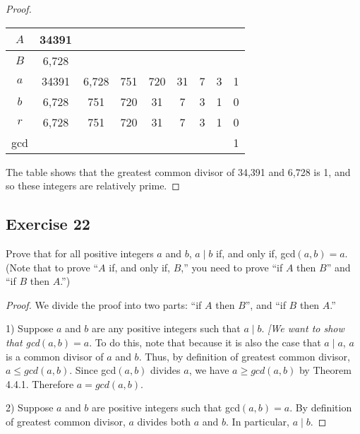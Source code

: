 \documentclass[14pt]{extarticle}
\begin{document}
\begin{proof}
    \begin{center}
        \begin{tabular}{|c|c|c|c|c|c|c|c|c|}
            \hline
            $A$ & 34391 &       &     &     &    &   &   &   \\
            \hline
            $B$ & 6,728 &       &     &     &    &   &   &   \\
            \hline
            $a$ & 34391 & 6,728 & 751 & 720 & 31 & 7 & 3 & 1 \\
            \hline
            $b$ & 6,728 & 751   & 720 & 31  & 7  & 3 & 1 & 0 \\
            \hline
            $r$ & 6,728 & 751   & 720 & 31  & 7  & 3 & 1 & 0 \\
            \hline
            gcd &       &       &     &     &    &   &   & 1 \\
            \hline
        \end{tabular}
    \end{center}

    The table shows that the greatest common divisor of 34,391 and 6,728 is 1, and so these integers are relatively prime.
\end{proof}

\subsection{Exercise 22}
Prove that for all positive integers $a$ and $b$, $a \mid b$ if, and only if, gcd$(a, b) = a$. (Note that to prove “$A$ if, and only if, $B$,” you need to prove “if $A$ then $B$” and “if $B$ then $A$.”)

\begin{proof}
    We divide the proof into two parts: “if $A$ then $B$”, and “if $B$ then $A$.”

    1) Suppose $a$ and $b$ are any positive integers such that $a\mid b$. {\it [We want to show that gcd$(a, b) = a$}. To do this, note that because it is also the case that $a \mid a$, $a$ is a common divisor of $a$ and $b$. Thus, by definition of greatest common divisor, $a \leq gcd(a, b)$. Since gcd$(a,b)$ divides $a$, we have $a \geq gcd(a, b)$ by Theorem 4.4.1. Therefore $a = gcd(a,b)$.

    2) Suppose $a$ and $b$ are positive integers such that gcd$(a, b) = a$. By definition of greatest common divisor, $a$ divides both $a$ and $b$. In particular, $a \mid b$.
\end{proof}
\end{document}
